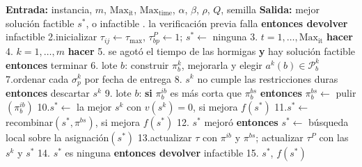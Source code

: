 \startplacefigure[title={Pseudocódigo de \ac{aco}.}, reference=fig:aco_pseudocodigo]
\startframedtext[width=broad, frame=on, align=flushleft]
\startlines
{\bf Entrada:} instancia, $m$, $\text{Max}_{\text{it}}$, $\text{Max}_{\text{time}}$, $\alpha$, $\beta$, $\rho$, $Q$, semilla
{\bf Salida:} mejor solución factible $s^*$, o infactible
. la verificación previa falla {\bf entonces devolver} infactible
2.\quad inicializar $\tau_{ij} \leftarrow \tau_{\max}$, $\tau^{P}_{bp} \leftarrow 1$;\; $s^* \leftarrow$ ninguna
3. $t = 1, \dots, \text{Max}_{\text{it}}$ {\bf hacer}
4.\quad{} $k = 1, \dots, m$ {\bf hacer}
5.\quad\qquad{} se agotó el tiempo de las hormigas {\bf y} hay solución factible {\bf entonces} terminar
6.\quad\qquad{} lote $b$: construir $\pi^k_b$, mejorarla y elegir $a^k(b) \in \mathcal{P}^k_b$
7.\quad\qquad\qquad ordenar cada $\sigma^k_p$ por fecha de entrega
8.\quad\qquad{} $s^k$ no cumple las restricciones duras {\bf entonces} descartar $s^k$
9.\quad{} lote $b$: {\bf si} $\pi^{ib}_b$ es más corta que $\pi^{bs}_b$ {\bf entonces} $\pi^{bs}_b \leftarrow$ pulir$(\pi^{ib}_b)$
10.\quad\qquad $s^* \leftarrow$ la mejor $s^k$ con $v(s^k) = 0$, si mejora $f(s^*)$
11.\quad\qquad $s^* \leftarrow$ recombinar$(s^*, \pi^{bs})$, si mejora $f(s^*)$
12.\quad{} $s^*$ mejoró {\bf entonces} $s^* \leftarrow$ búsqueda local sobre la asignación$(s^*)$
13.\quad\qquad actualizar $\tau$ con $\pi^{ib}$ y $\pi^{bs}$;\; actualizar $\tau^{P}$ con las $s^k$ y $s^*$
14. $s^*$ es ninguna {\bf entonces devolver} infactible
15. $s^*$, $f(s^*)$
\stoplines
\stopframedtext
\stopplacefigure

\stopsection
\stopchapter

